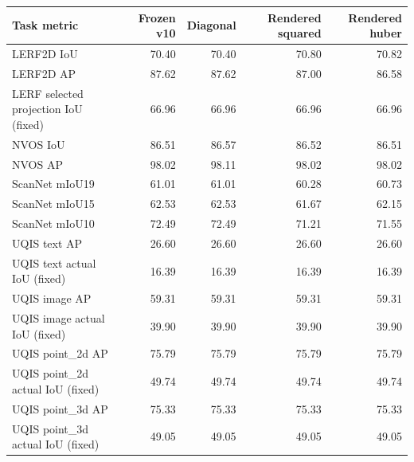 \begin{tabular}{lrrrr}
\toprule
Task metric & Frozen v10 & Diagonal & Rendered squared & Rendered huber \\
\midrule
LERF2D IoU & 70.40 & 70.40 & 70.80 & 70.82 \\
LERF2D AP & 87.62 & 87.62 & 87.00 & 86.58 \\
LERF selected projection IoU (fixed) & 66.96 & 66.96 & 66.96 & 66.96 \\
NVOS IoU & 86.51 & 86.57 & 86.52 & 86.51 \\
NVOS AP & 98.02 & 98.11 & 98.02 & 98.02 \\
ScanNet mIoU19 & 61.01 & 61.01 & 60.28 & 60.73 \\
ScanNet mIoU15 & 62.53 & 62.53 & 61.67 & 62.15 \\
ScanNet mIoU10 & 72.49 & 72.49 & 71.21 & 71.55 \\
UQIS text AP & 26.60 & 26.60 & 26.60 & 26.60 \\
UQIS text actual IoU (fixed) & 16.39 & 16.39 & 16.39 & 16.39 \\
UQIS image AP & 59.31 & 59.31 & 59.31 & 59.31 \\
UQIS image actual IoU (fixed) & 39.90 & 39.90 & 39.90 & 39.90 \\
UQIS point\_2d AP & 75.79 & 75.79 & 75.79 & 75.79 \\
UQIS point\_2d actual IoU (fixed) & 49.74 & 49.74 & 49.74 & 49.74 \\
UQIS point\_3d AP & 75.33 & 75.33 & 75.33 & 75.33 \\
UQIS point\_3d actual IoU (fixed) & 49.05 & 49.05 & 49.05 & 49.05 \\
\bottomrule
\end{tabular}
